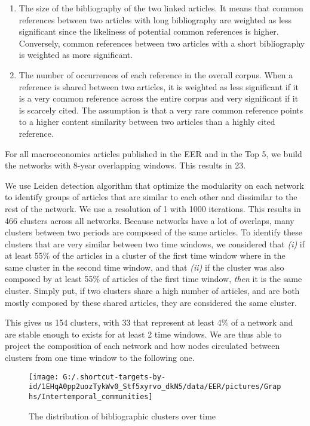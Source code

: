 \documentclass[]{elsarticle} %
\providecommand{\tightlist}{%
  \setlength{\itemsep}{0pt}\setlength{\parskip}{0pt}}
\begin{document}
\begin{enumerate}
\def\labelenumi{\arabic{enumi}.}
\tightlist
\item
  The size of the bibliography of the two linked articles. It means that
  common references between two articles with long bibliography are
  weighted as less significant since the likeliness of potential common
  references is higher. Conversely, common references between two
  articles with a short bibliography is weighted as more significant.
\item
  The number of occurrences of each reference in the overall corpus.
  When a reference is shared between two articles, it is weighted as
  less significant if it is a very common reference across the entire
  corpus and very significant if it is scarcely cited. The assumption is
  that a very rare common reference points to a higher content
  similarity between two articles than a highly cited reference.
\end{enumerate}

For all macroeconomics articles published in the EER and in the Top 5,
we build the networks with 8-year overlapping windows. This results in
23.

We use Leiden detection algorithm \citep{traag2019} that optimize the
modularity on each network to identify groups of articles that are
similar to each other and dissimilar to the rest of the network. We use
a resolution of 1 with 1000 iterations. This results in 466 clusters
across all networks. Because networks have a lot of overlaps, many
clusters between two periods are composed of the same articles. To
identify these clusters that are very similar between two time windows,
we considered that \emph{(i)} if at least 55\% of the articles in a
cluster of the first time window where in the same cluster in the second
time window, and that \emph{(ii)} if the cluster was also composed by at
least 55\% of articles of the first time window, \emph{then} it is the
same cluster. Simply put, if two clusters share a high number of
articles, and are both mostly composed by these shared articles, they
are considered the same cluster.

This gives us 154 clusters, with 33 that represent at least 4\% of a
network and are stable enough to exists for at least 2 time windows. We
are thus able to project the composition of each network and how nodes
circulated between clusters from one time window to the following one.

\begin{figure}[h]

{\centering \texttt{[image: G:/.shortcut-targets-by-id/1EHqA0pp2uozTykWv0\_Stf5xyrvo\_dkN5/data/EER/pictures/Graphs/Intertemporal\_communities]} 

}

\caption{The distribution of bibliographic clusters over time}\label{fig:plot-cluster-flow}
\end{figure}
\end{document}
